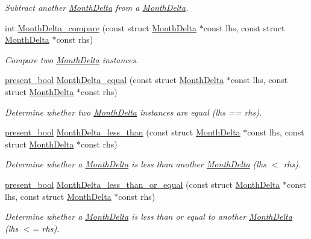 \begin{DoxyCompactItemize}
\begin{DoxyCompactList}\small\item\em Subtract another \hyperlink{structMonthDelta}{Month\-Delta} from a \hyperlink{structMonthDelta}{Month\-Delta}. \end{DoxyCompactList}\item 
int \hyperlink{month-delta_8h_a1428161f8576c24beb2208127abd890e}{Month\-Delta\-\_\-compare} (const struct \hyperlink{structMonthDelta}{Month\-Delta} $\ast$const lhs, const struct \hyperlink{structMonthDelta}{Month\-Delta} $\ast$const rhs)
\begin{DoxyCompactList}\small\item\em Compare two \hyperlink{structMonthDelta}{Month\-Delta} instances. \end{DoxyCompactList}\item 
\hyperlink{types_8h_a1c24e2cdd988b886e889080ded176ae0}{present\-\_\-bool} \hyperlink{month-delta_8h_a91491c8d411b52dee3ecd6bcf0b3f097}{Month\-Delta\-\_\-equal} (const struct \hyperlink{structMonthDelta}{Month\-Delta} $\ast$const lhs, const struct \hyperlink{structMonthDelta}{Month\-Delta} $\ast$const rhs)
\begin{DoxyCompactList}\small\item\em Determine whether two \hyperlink{structMonthDelta}{Month\-Delta} instances are equal (lhs == rhs). \end{DoxyCompactList}\item 
\hyperlink{types_8h_a1c24e2cdd988b886e889080ded176ae0}{present\-\_\-bool} \hyperlink{month-delta_8h_af10d7aa9aad3ecb5d10f2091fa4fb5c4}{Month\-Delta\-\_\-less\-\_\-than} (const struct \hyperlink{structMonthDelta}{Month\-Delta} $\ast$const lhs, const struct \hyperlink{structMonthDelta}{Month\-Delta} $\ast$const rhs)
\begin{DoxyCompactList}\small\item\em Determine whether a \hyperlink{structMonthDelta}{Month\-Delta} is less than another \hyperlink{structMonthDelta}{Month\-Delta} (lhs $<$ rhs). \end{DoxyCompactList}\item 
\hyperlink{types_8h_a1c24e2cdd988b886e889080ded176ae0}{present\-\_\-bool} \hyperlink{month-delta_8h_a6f360c9e40307f6643c309ccc66fb5a5}{Month\-Delta\-\_\-less\-\_\-than\-\_\-or\-\_\-equal} (const struct \hyperlink{structMonthDelta}{Month\-Delta} $\ast$const lhs, const struct \hyperlink{structMonthDelta}{Month\-Delta} $\ast$const rhs)
\begin{DoxyCompactList}\small\item\em Determine whether a \hyperlink{structMonthDelta}{Month\-Delta} is less than or equal to another \hyperlink{structMonthDelta}{Month\-Delta} (lhs $<$= rhs). \end{DoxyCompactList}\item 

\end{DoxyCompactItemize}
